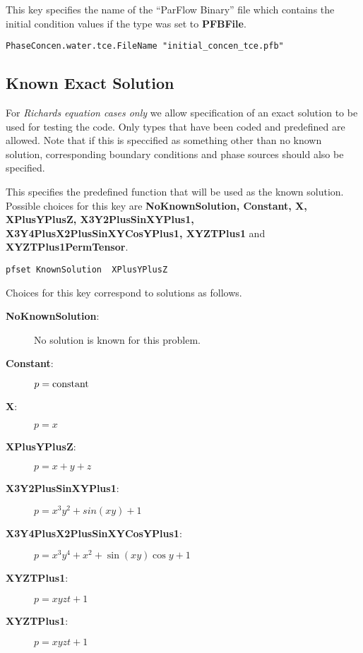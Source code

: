 {
This key specifies the name of the ``ParFlow Binary'' file which
contains the initial condition values if the type was set to {\bf PFBFile}.
}
\begin{display}\begin{verbatim}
PhaseConcen.water.tce.FileName "initial_concen_tce.pfb"
\end{verbatim}\end{display}


\subsection{Known Exact Solution}
\label{ExactSolution}

For {\em Richards equation cases only} we allow specification of an exact
solution to be used for testing the code.  
Only types that have been coded and predefined are allowed.
Note that if this is speccified as something other than no known solution,
corresponding boundary conditions and phase sources should also be specified.

{This specifies the predefined function that will be used as the known
solution.  Possible choices for this key are {\bf NoKnownSolution, Constant, 
X, XPlusYPlusZ, X3Y2PlusSinXYPlus1, X3Y4PlusX2PlusSinXYCosYPlus1, XYZTPlus1}
and {\bf XYZTPlus1PermTensor}.
}
\begin{display}\begin{verbatim}
pfset KnownSolution  XPlusYPlusZ
\end{verbatim}\end{display}
Choices for this key correspond to solutions as follows.
\begin{description}
\item[{\bf NoKnownSolution}: ] No solution is known for this problem.
\item[{\bf Constant}: ] $p = {\rm constant}$
\item[{\bf X}: ] $p = x$
\item[{\bf XPlusYPlusZ}: ] $p = x + y + z$
\item[{\bf X3Y2PlusSinXYPlus1}: ] $p = x^3 y^2 + sin(xy) + 1$
\item[{\bf X3Y4PlusX2PlusSinXYCosYPlus1}: ] 
$p = x^3 y^4 + x^2 + \sin(xy)\cos y + 1$
\item[{\bf XYZTPlus1}: ] $p = xyzt + 1$
\item[{\bf XYZTPlus1}: ] $p = xyzt + 1$
\end{description}

